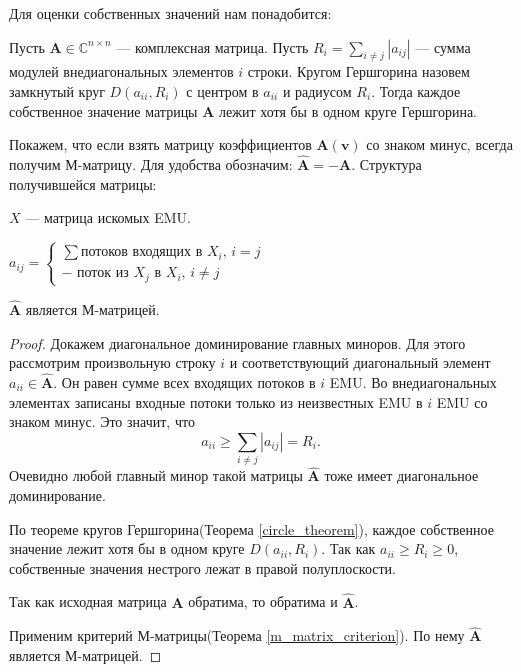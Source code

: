 \documentclass[14pt, a4paper]{extreport}
\begin{document}
Для оценки собственных значений нам понадобится:
\begin{theorem}
	\label{circle_theorem}
	Пусть $\mathbf{A} \in \mathbb{C}^{n \times n}$ --- комплексная матрица. Пусть $R_i = \sum_{i \neq j} |a_{ij}|$ --- сумма модулей внедиагональных элементов $i$ строки. Кругом Гершгорина назовем замкнутый круг $D(a_{ii}, R_i)$ с центром в $a_{ii}$ и радиусом $R_i$. Тогда каждое собственное значение матрицы $\mathbf{A}$ лежит хотя бы в одном круге Гершгорина. 
\end{theorem}

Покажем, что если взять матрицу коэффициентов $\mathbf{A}(\mathbf{v})$ со знаком минус, всегда получим М-матрицу. Для удобства обозначим: $\hat{\mathbf{A}} = -\mathbf{A}$. Структура получившейся матрицы:

$X$ --- матрица искомых EMU.

$a_{ij} = 
\begin{cases} 
\text{$\sum$потоков входящих в $X_i$, $i=j$}\\
\text{$-$ поток из $X_j$ в $X_i$, $i\neq{}j$}
\end{cases}
$
\clearpage


\begin{theorem}
	$\hat{\mathbf{A}}$ является М-матрицей.
\end{theorem}

\begin{proof}
	Докажем диагональное доминирование главных миноров. Для этого рассмотрим произвольную строку $i$ и соответствующий диагональный элемент $a_{ii} \in \hat{\mathbf{A}}$. Он равен сумме всех входящих потоков в $i$ EMU. Во внедиагональных элементах записаны входные потоки только из неизвестных EMU в $i$ EMU со знаком минус. Это значит, что $$a_{ii} \geq \sum_{i \neq j} |a_{ij}| = R_i.$$Очевидно любой главный минор такой матрицы $\hat{\mathbf{A}}$ тоже имеет диагональное доминирование. 
	
	По теореме кругов Гершгорина(Теорема \ref{circle_theorem}), каждое собственное значение лежит хотя бы в одном круге $D(a_{ii}, R_i)$. Так как $a_{ii} \geq R_i \geq 0$, собственные значения нестрого лежат в правой полуплоскости.
	
	Так как исходная матрица $\mathbf{A}$ обратима, то обратима и $\hat{\mathbf{A}}$.
	
	Применим критерий М-матрицы(Теорема \ref{m_matrix_criterion}). По нему $\hat{\mathbf{A}}$ является М-матрицей.	
\end{proof}
\end{document}
